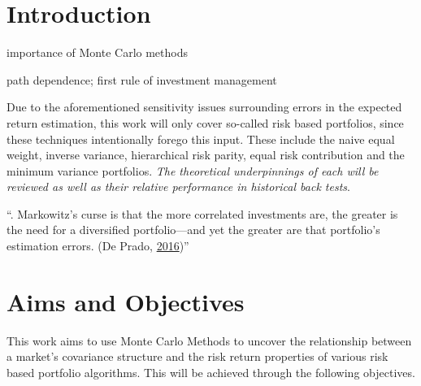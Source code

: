 \documentclass[11pt,preprint, authoryear]{elsarticle}
\numberwithin{equation}{section}
\numberwithin{figure}{section}
\numberwithin{table}{section}
\begin{document}

\headsep 35pt %




\hypertarget{introduction}{%
\section{\texorpdfstring{Introduction
\label{Introduction}}{Introduction }}\label{introduction}}

importance of Monte Carlo methods

path dependence; first rule of investment management

Due to the aforementioned sensitivity issues surrounding errors in the
expected return estimation, this work will only cover so-called risk
based portfolios, since these techniques intentionally forego this
input. These include the naive equal weight, inverse variance,
hierarchical risk parity, equal risk contribution and the minimum
variance portfolios. \emph{The theoretical underpinnings of each will be
reviewed as well as their relative performance in historical back
tests}.

``. Markowitz's curse is that the more correlated investments are, the
greater is the need for a diversified portfolio---and yet the greater
are that portfolio's estimation errors. (De Prado,
\protect\hyperlink{ref-lopez}{2016})''

\hypertarget{aims-and-objectives}{%
\section{Aims and Objectives}\label{aims-and-objectives}}

This work aims to use Monte Carlo Methods to uncover the relationship
between a market's covariance structure and the risk return properties
of various risk based portfolio algorithms. This will be achieved
through the following objectives.
\end{document}
